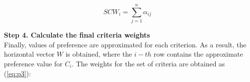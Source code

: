 \begin{equation}
SCW_i=\sum^{n}_{j=1}\alpha_{ij}
\label{eq:p2}
\end{equation}





\noindent \textbf{Step 4. Calculate the final criteria weights} \\

Finally, values of preference are approximated for each criterion. As a result, the horizontal vector $W$ is obtained, where the $i-th$ row contains the approximate preference value for $C_i$. The weights for the set of criteria are obtained as (\ref{eq:p3}):

